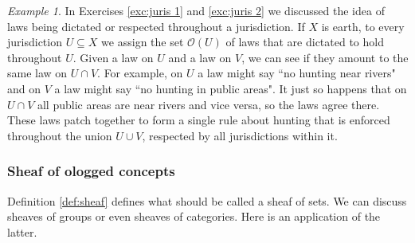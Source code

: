 \documentclass{book}
\def\mc{\mathcal}
\def\ss{\subseteq}
\def\mcO{\mc{O}}
\theoremstyle{remark}
\newtheorem{example}[subsubsection]{Example}
\theoremstyle{definition}
\begin{document}
\begin{example}

In Exercises \ref{exc:juris 1} and \ref{exc:juris 2} we discussed the idea of laws being dictated or respected throughout a jurisdiction. If $X$ is earth, to every jurisdiction $U\ss X$ we assign the set $\mcO(U)$ of laws that are dictated to hold throughout $U$. Given a law on $U$ and a law on $V$, we can see if they amount to the same law on $U\cap V$. For example, on $U$ a law  might say ``no hunting near rivers" and on $V$ a law might say ``no hunting in public areas". It just so happens that on $U\cap V$ all public areas are near rivers and vice versa, so the laws agree there. These laws patch together to form a single rule about hunting that is enforced throughout the union $U\cup V$, respected by all jurisdictions within it.

\end{example}


\subsubsection{Sheaf of ologged concepts}

Definition \ref{def:sheaf} defines what should be called a sheaf of sets. We can discuss sheaves of groups or even sheaves of categories. Here is an application of the latter.
\end{document}
